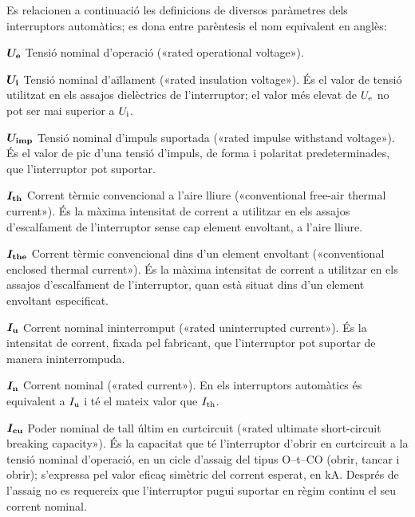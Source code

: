 Es relacionen a continuació les definicions de diversos paràmetres dels interruptors automàtics; es dona entre parèntesis el nom equivalent en anglès:
\begin{list}{}
   {\setlength{\labelwidth}{10mm} \setlength{\leftmargin}{10mm} \setlength{\labelsep}{2mm}}
   \item[$\boldsymbol{U_\mathrm{e}}$] Tensió nominal d'operació («rated operational voltage»).
   \item[$\boldsymbol{U_\mathrm{i}}$] Tensió nominal d'aïllament («rated insulation voltage»). És el valor de tensió utilitzat en els assajos dielèctrics de l'interruptor;  el valor més elevat de $U_\mathrm{e}$ no pot ser mai superior a $U_\mathrm{i}$.
    \item[$\boldsymbol{U_\mathrm{imp}}$] Tensió nominal d'impuls suportada («rated impulse withstand voltage»). És el valor de pic d'una tensió d'impuls, de forma i polaritat predeterminades, que l'interruptor pot suportar.
   \item[$\boldsymbol{I_\mathrm{th}}$] Corrent tèrmic convencional a l'aire lliure («conventional free-air thermal current»).  És la  màxima intensitat de corrent a utilitzar en els assajos d'escalfament de l'interruptor sense cap element envoltant, a l'aire lliure.
   \item[$\boldsymbol{I_\mathrm{the}}$] Corrent tèrmic convencional dins d'un element envoltant («conventional enclosed thermal current»).  És la màxima intensitat de corrent a utilitzar en els assajos d'escalfament de l'interruptor, quan està situat dins d'un element envoltant especificat.
    \item[$\boldsymbol{I_\mathrm{u}}$] Corrent nominal ininterromput («rated uninterrupted current»).  És la intensitat  de corrent, fixada pel fabricant, que l'interruptor pot suportar de manera ininterrompuda.
    \item[$\boldsymbol{I_\mathrm{n}}$] Corrent nominal («rated current»).  En els interruptors automàtics és equivalent a $I_\mathrm{u}$ i té el mateix valor que $I_\mathrm{th}$.
    \item[$\boldsymbol{I_\mathrm{cu}}$] Poder nominal de tall últim en curtcircuit («rated ultimate  short-circuit breaking capacity»). És la capacitat que té l'interruptor d'obrir en curtcircuit a la tensió nominal d'operació, en un cicle d'assaig del tipus O--t--CO (obrir, tancar i obrir); s'expressa pel valor eficaç simètric del corrent esperat, en kA. Després de l'assaig no es requereix que l'interruptor pugui suportar en règim continu el seu corrent nominal.

\end{list}
